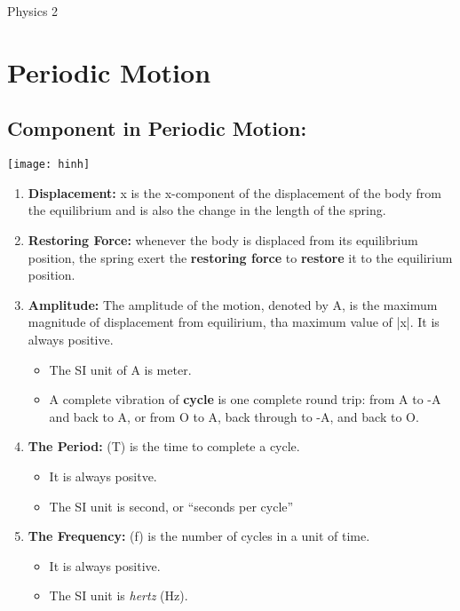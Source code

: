 \documentclass[10pt]{article}
\begin{document}
\begin{center}
	Physics 2
\end{center}

\section{Periodic Motion}

\subsection{Component in Periodic Motion: }
\texttt{[image: hinh]}
\bigbreak
	\begin{enumerate}
		\item \textbf{Displacement: } x is the x-component of the displacement of the body from the equilibrium and is also the change in the length of the spring. \\
		\item \textbf{Restoring Force: } whenever the body is displaced from its equilibrium position, the spring exert the \textbf{restoring force} to \textbf{restore} it to the equilirium position. 
		\item \textbf{Amplitude: } The amplitude of the motion, denoted by A, is the maximum magnitude of displacement from equilirium, tha maximum value of |x|. It is always positive. \\
		\begin{itemize}
			\item  The SI unit of A is meter.
			\item A complete vibration of \textbf{cycle} is one complete round trip: from A to -A and back to A, or from O to A, back through to -A, and back to O. \\
		\end{itemize}
		\item \textbf{The Period: } (T) is the time to complete a cycle. \\
		\begin{itemize}
			\item It is always positve.
			\item The SI unit is second, or ``seconds per cycle''
		\end{itemize}
		\item \textbf{The Frequency: } (f) is the number of cycles in a unit of time.
		\begin{itemize}
			\item It is always positive. 
			\item The SI unit is \textit{hertz} (Hz). \\

\end{itemize}
\end{enumerate}
\end{document}

